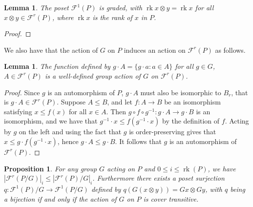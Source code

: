 \documentclass{amsart}
\newtheorem{lem}[thm]{Lemma}
\newtheorem{prop}[thm]{Proposition}
\theoremstyle{remark}
\newcommand\rk{\operatorname{rk}}
\begin{document}
\begin{lem}
The poset $\mathcal{F}^1(P)$ is graded, with $\rk{x\otimes y} = \rk{x}$ for all $x\otimes y\in \mathcal{F}^r(P)$, where $\rk{x}$ is the rank of $x$ in $P$.
\end{lem}

\begin{proof}
\end{proof}

We also have that the action of $G$ on $P$ induces an action on $\mathcal{F}^r(P)$ as follows.  

\begin{lem}\label{lem:G_action_on_FP}
The function defined by $g\cdot A = \{g\cdot a \colon a\in A\}$ for all $g\in G$, $A\in \mathcal{F}^r(P)$ is a well-defined group action of $G$ on $\mathcal{F}^r(P)$.
\end{lem}  

\begin{proof}
Since $g$ is an automorphism of $P$, $g\cdot A$ must also be isomorphic to $B_r$, that is $g\cdot A\in \mathcal{F}^r(P)$.  Suppose $A\le B$, and let $f\colon A\rightarrow B$ be an isomorphism satisfying $x\le f(x)$ for all $x\in A$.  Then $g\circ f\circ g^{-1}\colon g\cdot A \rightarrow g\cdot B$ is an isomorphism, and we have that $g^{-1}\cdot x \le f(g^{-1}\cdot x)$ by the definition of $f$.  Acting by $g$ on the left and using the fact that $g$ is order-preserving gives that $x\le g\cdot f(g^{-1}\cdot x)$, hence $g\cdot A\le g\cdot B$.  It follows that $g$ is an automorphism of $\mathcal{F}^r(P)$.
\end{proof}

\begin{prop}\label{prop:surjection_between_F_quotients}
For any group $G$ acting on $P$ and $0\le i\le \rk(P)$, we have $|\mathcal{F}^r(P/G)|_i \le |\mathcal{F}^r(P)/G|_i$. Furthermore there exists a poset surjection $q\colon \mathcal{F}^1(P)/G\rightarrow \mathcal{F}^1(P/G)$ defined by $q(G(x\otimes y)) = Gx\otimes Gy$, with $q$ being a bijection if and only if the action of $G$ on $P$ is cover transitive.
\end{prop}
\end{document}
